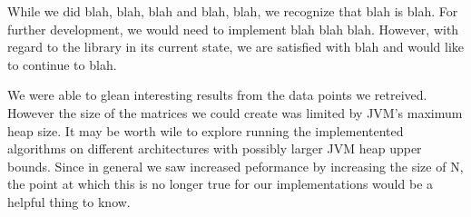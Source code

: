 \documentclass{dependencies/acm_proc_article-sp}
\begin{document}
While we did blah, blah, blah and blah, blah, we recognize that blah is blah. For further development, we would need to implement blah blah blah. However, with regard to the library in its current state, we are satisfied with blah and would like to continue to blah.

We were able to glean interesting results from the data points we retreived.
However the size of the matrices we could create was limited by JVM's maximum heap size.
It may be worth wile to explore running the implementented
algorithms on different architectures with possibly larger JVM heap upper
bounds. Since in general we saw increased peformance by increasing the size of
N, the point at which this is no longer true for our implementations would be a
helpful thing to know.


\newpage

\newpage
%

%
%
\balancecolumns
\end{document}
